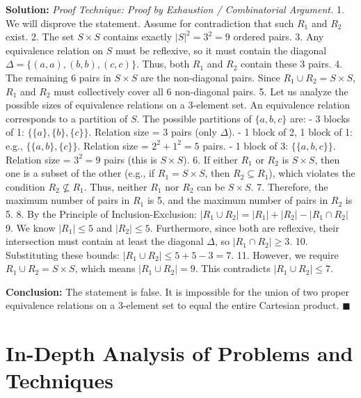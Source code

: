 \documentclass[11pt, a4paper]{article}
\theoremstyle{definition}
\theoremstyle{remark}
\begin{document}
\textbf{Solution:}
\textit{Proof Technique: Proof by Exhaustion / Combinatorial Argument.}
1. We will disprove the statement. Assume for contradiction that such $R_1$ and $R_2$ exist.
2. The set $S \times S$ contains exactly $|S|^2 = 3^2 = 9$ ordered pairs.
3. Any equivalence relation on $S$ must be reflexive, so it must contain the diagonal $\Delta = \{(a,a), (b,b), (c,c)\}$. Thus, both $R_1$ and $R_2$ contain these 3 pairs.
4. The remaining 6 pairs in $S \times S$ are the non-diagonal pairs. Since $R_1 \cup R_2 = S \times S$, $R_1$ and $R_2$ must collectively cover all 6 non-diagonal pairs.
5. Let us analyze the possible sizes of equivalence relations on a 3-element set. An equivalence relation corresponds to a partition of $S$. The possible partitions of $\{a,b,c\}$ are:
   - 3 blocks of 1: $\{\{a\}, \{b\}, \{c\}\}$. Relation size = 3 pairs (only $\Delta$).
   - 1 block of 2, 1 block of 1: e.g., $\{\{a,b\}, \{c\}\}$. Relation size = $2^2 + 1^2 = 5$ pairs.
   - 1 block of 3: $\{\{a,b,c\}\}$. Relation size = $3^2 = 9$ pairs (this is $S \times S$).
6. If either $R_1$ or $R_2$ is $S \times S$, then one is a subset of the other (e.g., if $R_1 = S \times S$, then $R_2 \subseteq R_1$), which violates the condition $R_2 \not\subseteq R_1$. Thus, neither $R_1$ nor $R_2$ can be $S \times S$.
7. Therefore, the maximum number of pairs in $R_1$ is 5, and the maximum number of pairs in $R_2$ is 5.
8. By the Principle of Inclusion-Exclusion:
   $|R_1 \cup R_2| = |R_1| + |R_2| - |R_1 \cap R_2|$
9. We know $|R_1| \le 5$ and $|R_2| \le 5$. Furthermore, since both are reflexive, their intersection must contain at least the diagonal $\Delta$, so $|R_1 \cap R_2| \ge 3$.
10. Substituting these bounds:
    $|R_1 \cup R_2| \le 5 + 5 - 3 = 7$.
11. However, we require $R_1 \cup R_2 = S \times S$, which means $|R_1 \cup R_2| = 9$. This contradicts $|R_1 \cup R_2| \le 7$.

\textbf{Conclusion:} The statement is false. It is impossible for the union of two proper equivalence relations on a 3-element set to equal the entire Cartesian product. $\blacksquare$

\newpage

\section{In-Depth Analysis of Problems and Techniques}
\end{document}
